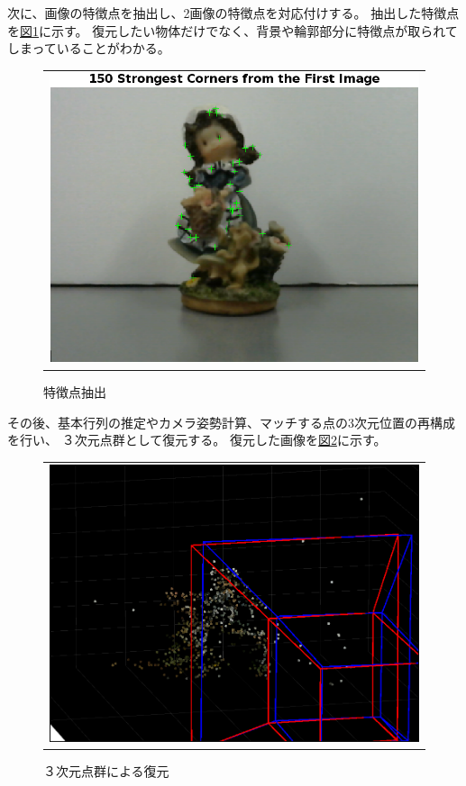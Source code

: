 \documentclass[]{jarticle}          %
\begin{document}
\newline
次に、画像の特徴点を抽出し、2画像の特徴点を対応付けする。
抽出した特徴点を\hyperref[six]{図\ref{six}}に示す。
復元したい物体だけでなく、背景や輪郭部分に特徴点が取られてしまっていることがわかる。
\begin{figure}[!ht]
  \begin{center}
    \begin{tabular}{c}
      \includegraphics[keepaspectratio, scale=0.9]{figures/3.png}\\
    \end{tabular}
  \end{center}
  \caption{特徴点抽出}
  \label{six}
\end{figure}
\newline
その後、基本行列の推定やカメラ姿勢計算、マッチする点の3次元位置の再構成を行い、
３次元点群として復元する。
復元した画像を\hyperref[seven]{図\ref{seven}}に示す。
\begin{figure}[!ht]
  \begin{center}
    \begin{tabular}{c}
      \includegraphics[keepaspectratio, scale=0.7]{figures/7.png}\\
    \end{tabular}
  \end{center}
  \caption{３次元点群による復元}
  \label{seven}
\end{figure}
\end{document}
